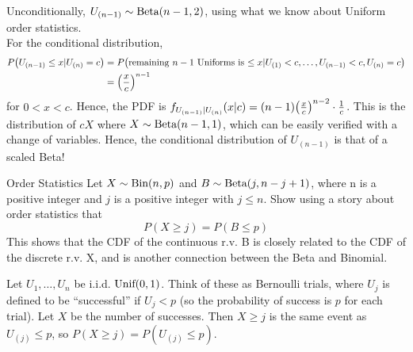 \documentclass[11.5pt]{article}
\begin{document}
\begin{solution}{3.5}
Unconditionally, $U_{(n - 1)} \sim \textrm{Beta}(n - 1, 2)$, using what we know about Uniform order statistics. \\
For the conditional distribution,
\begin{align*}
P\paren{U_{(n - 1)} \leq x | U_{(n)} = c} &= P\paren{\textrm{remaining $n - 1$ Uniforms is $\leq x$} | U_{(1)} < c, \ldots, U_{(n - 1)} < c, U_{(n)} = c} \\
&= \paren{\frac{x}{c}}^{n - 1}
\end{align*}
for $0 < x < c$. Hence, the PDF is $f_{U_{(n - 1)} | U_{(n)}}(x | c) = (n - 1)\paren{\frac{x}{c}}^{n - 2} \cdot \frac{1}{c}$. This is the distribution of $cX$ where $X \sim \textrm{Beta}(n - 1, 1)$, which can be easily verified with a change of variables. Hence, the conditional distribution of $U_{(n - 1)}$ is that of a scaled Beta!
\end{solution}


\begin{exercise}{Order Statistics}
Let $X\sim \textrm{Bin}(n, p)$ and $B \sim \textrm{Beta}(j, n - j +1)$, where n is a positive integer and $j$ is a positive integer with $j \leq n$. Show using a story about order statistics that $$P(X \geq j) = P(B \leq p)$$
This shows that the CDF of the continuous r.v. B is closely related to the CDF of the discrete r.v. X, and is another connection between the Beta and Binomial.
\end{exercise}

\begin{solution}{2.5}
Let $U_1, \ldots, U_n$ be i.i.d. $\textrm{Unif}(0, 1)$. Think of these as Bernoulli trials, where $U_j$ is defined to be ``successful'' if $U_j < p$ (so the probability of success is $p$ for each trial). Let $X$ be the number of successes. Then $X \geq j$ is the same event as $U_{(j)} \leq p$, so $P(X \geq j) = P(U_{(j)} \leq p)$.
\end{solution}
\end{document}
